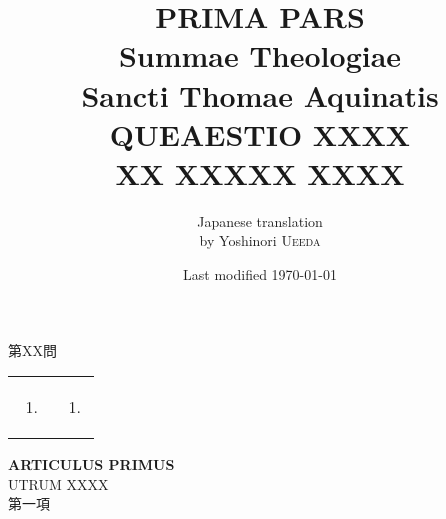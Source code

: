 \documentclass[paper=a4paper,fontsize=10pt,jafontsize=9pt,titlepage]{jlreq}
\title{{\bfseries PRIMA PARS}\\Summae Theologiae\\Sancti Thomae
Aquinatis\\{\sffamily QUEAESTIO XXXX}\\XX XXXXX XXXX}
\author{Japanese translation\\by Yoshinori {\scshape Ueeda}}
\date{Last modified \today}
\begin{document}
\maketitle
\begin{center}
{\Large 第XX問\\}
\end{center}

\begin{longtable}{p{21em}p{21em}}

\begin{enumerate}
 \item 
\end{enumerate}

&


\begin{enumerate}
 \item 
\end{enumerate}
\end{longtable}

\newpage
{}
\begin{center}
{\Large {\bfseries ARTICULUS PRIMUS}\\UTRUM XXXX}\\
{\large 第一項\\}
\end{center}

\begin{longtable}{p{21em}p{21em}}


\end{longtable}
\end{document}
